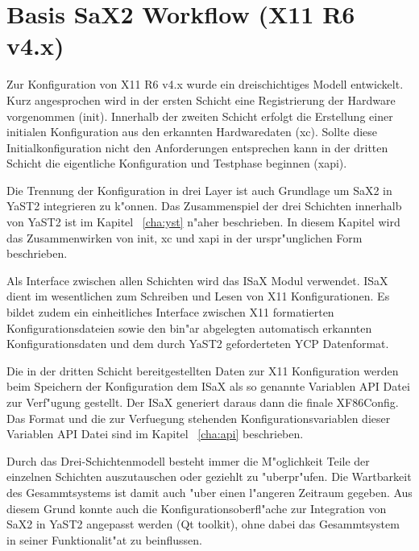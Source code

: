 \chapter{Basis SaX2 Workflow (X11 R6 v4.x)}
\label{cha:dsp}
\minitoc
Zur Konfiguration von X11 R6 v4.x wurde ein dreischichtiges Modell
entwickelt. Kurz angesprochen wird in der ersten Schicht eine
Registrierung der Hardware vorgenommen (init). Innerhalb der 
zweiten Schicht erfolgt die Erstellung einer initialen Konfiguration
aus den erkannten Hardwaredaten (xc). Sollte diese Initialkonfiguration
nicht den Anforderungen entsprechen kann in der dritten Schicht
die eigentliche Konfiguration und Testphase beginnen (xapi).

Die Trennung der Konfiguration in drei Layer ist auch Grundlage
um SaX2 in YaST2 integrieren zu k"onnen. Das Zusammenspiel
der drei Schichten innerhalb von YaST2 ist im Kapitel ~\ref{cha:yst}
n"aher beschrieben. In diesem Kapitel wird das Zusammenwirken von
init, xc und xapi in der urspr"unglichen Form beschrieben.

Als Interface zwischen allen Schichten wird das ISaX Modul
verwendet. ISaX dient im wesentlichen zum Schreiben und Lesen
von X11 Konfigurationen. Es bildet zudem ein einheitliches Interface
zwischen X11 formatierten Konfigurationsdateien sowie den bin"ar
abgelegten automatisch erkannten Konfigurationsdaten und dem
durch YaST2 geforderteten YCP Datenformat.

Die in der dritten Schicht bereitgestellten Daten zur X11 Konfiguration
werden beim Speichern der Konfiguration dem ISaX als so genannte 
Variablen API Datei zur Verf"ugung gestellt. Der ISaX generiert daraus
dann die finale XF86Config. Das Format und die zur Verfuegung stehenden
Konfigurationsvariablen dieser Variablen API Datei sind im Kapitel 
~\ref{cha:api} beschrieben.

Durch das Drei-Schichtenmodell besteht immer die M"oglichkeit Teile 
der einzelnen Schichten auszutauschen oder geziehlt zu "uberpr"ufen.
Die Wartbarkeit des Gesammtsystems ist damit auch "uber einen l"angeren
Zeitraum gegeben. Aus diesem Grund konnte auch die 
Konfigurationsoberfl"ache zur Integration von SaX2 in YaST2 angepasst 
werden (Qt toolkit), ohne dabei das Gesammtsystem in seiner 
Funktionalit"at zu beinflussen.

